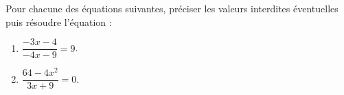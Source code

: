 \documentclass[a4paper,11pt,exos]{nsi} %
\begin{document}
\maketitle




\begin{exercice}
    Pour chacune des équations suivantes, préciser les valeurs interdites éventuelles puis résoudre l'équation :
    \begin{multicols}{3}
        \begin{enumerate}
            \item $\dfrac{-3x-4}{-4x-9}=9$.
	        \item $\dfrac{64-4x^2}{3x+9}=0$.
        \end{enumerate}
    \end{multicols}
    
\end{exercice}
\end{document}
